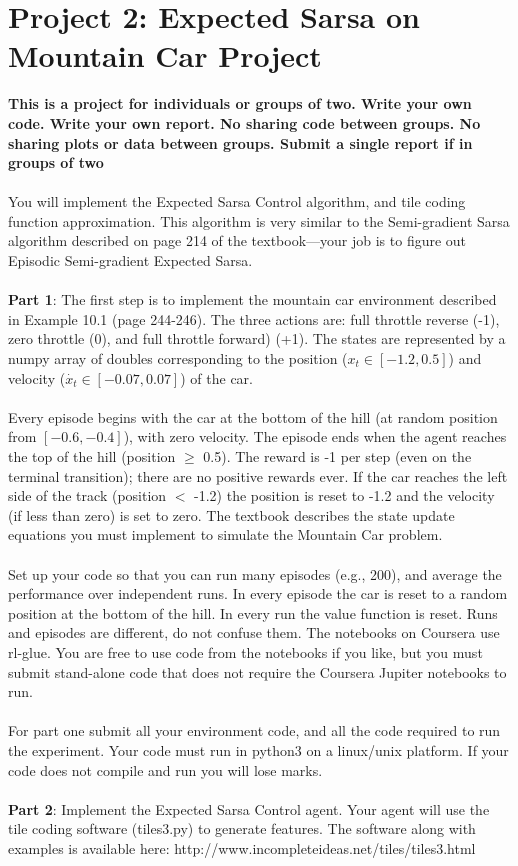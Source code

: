 \documentclass[10pt]{article}
\begin{document}
\section*{Project 2: Expected Sarsa on Mountain Car Project}
{\bf This is a project for individuals or groups of two. Write your own code. Write your own report. No sharing code between groups. No sharing plots or data between groups. Submit a single report if in groups of two}
\\\\
You will implement the Expected Sarsa Control algorithm, and tile coding function approximation. This algorithm is very similar to the Semi-gradient Sarsa algorithm described on page 214 of the textbook---your job is to figure out Episodic Semi-gradient Expected Sarsa.
\\\\
{\bf Part 1}: The first step is to implement the mountain car environment described in Example 10.1 (page 244-246). The three actions are: full throttle reverse (-1), zero throttle (0), and full throttle forward) (+1). The states are represented by a numpy array of doubles corresponding to the position ($x_t \in [-1.2, 0.5]$) and velocity ($\dot{x_t} \in [-0.07, 0.07]$) of the car. 
\\\\
Every episode begins with the car at the bottom of the hill (at random position from $[-0.6, -0.4]$), with zero velocity. The episode ends when the agent reaches the top of the hill (position $\ge$ 0.5). The reward is -1 per step (even on the terminal transition); there are no positive rewards ever. If the car reaches the left side of the track (position $<$ -1.2) the position is reset to -1.2 and the velocity (if less than zero) is set to zero. The textbook describes the state update equations you must implement to simulate the Mountain Car problem.
\\\\
Set up your code so that you can run many episodes (e.g., 200), and average the performance over independent runs. In every episode the car is reset to a random position at the bottom of the hill. In every run the value function is reset. Runs and episodes are different, do not confuse them. The notebooks on Coursera use rl-glue. You are free to use code from the notebooks if you like, but you must submit stand-alone code that does not require the Coursera Jupiter notebooks to run. 
\\\\
For part one submit all your environment code, and all the code required to run the experiment. Your code must run in python3 on a linux/unix platform. If your code does not compile and run you will lose marks.
\\\\
{\bf Part 2}: Implement the Expected Sarsa Control agent. Your agent will use the tile coding software (tiles3.py) to generate features. The software along with examples is available here:  http://www.incompleteideas.net/tiles/tiles3.html
\end{document}
